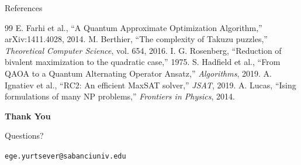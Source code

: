 \documentclass[aspectratio=169, t]{beamer}
\begin{document}
\begin{frame}{References}
\footnotesize
\begin{thebibliography}{99}
 E. Farhi et al., ``A Quantum Approximate Optimization Algorithm,'' arXiv:1411.4028, 2014.
 M. Berthier, ``The complexity of Takuzu puzzles,'' \textit{Theoretical Computer Science}, vol. 654, 2016.
 I. G. Rosenberg, ``Reduction of bivalent maximization to the quadratic case,'' 1975.
 S. Hadfield et al., ``From QAOA to a Quantum Alternating Operator Ansatz,'' \textit{Algorithms}, 2019.
 A. Ignatiev et al., ``RC2: An efficient MaxSAT solver,'' \textit{JSAT}, 2019.
 A. Lucas, ``Ising formulations of many NP problems,'' \textit{Frontiers in Physics}, 2014.
\end{thebibliography}
\end{frame}

\begin{frame}{}
\centering
\vfill
{\Large \textbf{Thank You}}

\bigskip
{\large Questions?}

\bigskip
\texttt{ege.yurtsever@sabanciuniv.edu}
\vfill
\end{frame}
\end{document}
